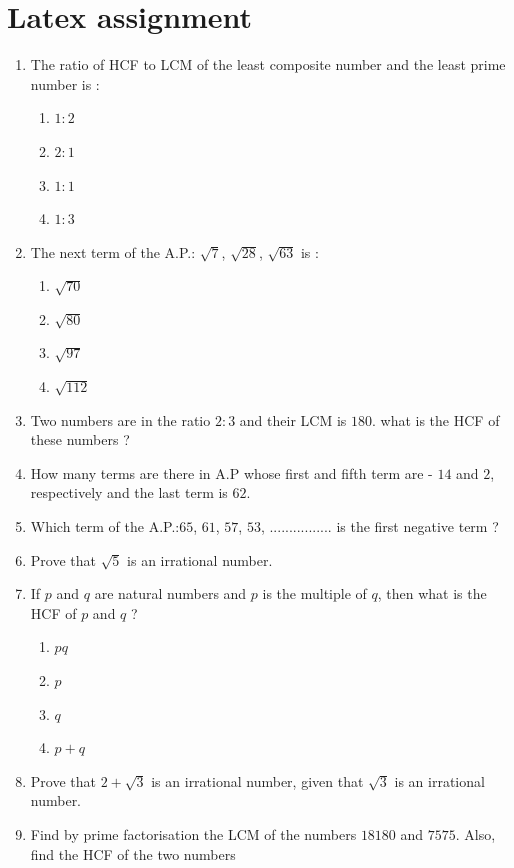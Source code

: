 \documentclass[12pt]{article}
\begin{document}
\section*{\center Latex assignment}
\begin{enumerate}
    \item  The ratio of HCF to LCM of the least composite number and the least prime number is :
    \begin{enumerate}[label=(\alph*)]
      \item $1:2$
      \item $2:1$
      \item $1:1$
      \item $1:3$
    \end{enumerate}
    \item The next term of the A.P.: $\sqrt{7}$, $\sqrt{28}$, $\sqrt{63}$ is :
    \begin{enumerate}[label=(\alph*)]
      \item $\sqrt{70}$
      \item $\sqrt{80}$
      \item $\sqrt{97}$
      \item $\sqrt{112}$
    \end{enumerate}
    \item Two numbers are in the ratio $2:3$ and their LCM is $180$. what is the HCF of these numbers ?
    \item How many terms are there in A.P whose first and fifth term are - $14$ and $2$, respectively and the last term is $62$.
    \item Which term of the A.P.:$65$, $61$, $57$, $53$, ................ is the first negative term ?
    \item Prove that $\sqrt{5}$ is an irrational number.
    \item If $p$ and $q$ are natural numbers and $p$ is the multiple of  $q$, then what is the HCF of $p$ and $q$ ?
    \begin{enumerate}[label=(\alph*)]
      \item $pq$
      \item $p$
      \item $q$
      \item $p+q$
      \end{enumerate}
    \item Prove that $2+\sqrt{3}$ is an irrational number, given that $\sqrt{3}$ is an irrational number.
        \item Find by prime factorisation the LCM of the numbers $18180$ and $7575$. Also, find the HCF of the two numbers

\end{enumerate}
\end{document}
